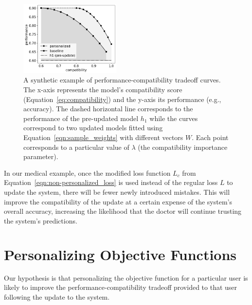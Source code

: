 \documentclass[letterpaper]{article}
\theoremstyle{definition}
\begin{document}
\begin{figure}[t]
\centering
\includegraphics[width=0.45\textwidth]{example_tradeoff}
\caption{A synthetic example of performance-compatibility tradeoff curves. The x-axis represents the model's compatibility score (Equation~\ref{eq:compatibility}) and the y-axis its performance (e.g., accuracy). The dashed horizontal line corresponds to the performance of the pre-updated model $h_1$ while the curves correspond to two updated models fitted using Equation~\ref{eqn:sample_weights} with different vectors $W$. Each point corresponds to a particular value of $\lambda$ (the compatibility importance parameter).
}
\label{fig:example_tradeoff}
\end{figure}
In our medical example, once the modified loss function $L_c$ from Equation~\ref{eqn:non-personalized_loss} is used instead of the regular loss $L$ to update the system, there will be fewer newly introduced mistakes. This will improve the compatibility of the update at a certain expense of the system's overall accuracy, increasing the likelihood that the doctor will continue trusting the system's predictions.
\section{Personalizing Objective Functions}
\label{sec:personalization}

Our hypothesis is that personalizing the objective function for a particular user is likely to improve the performance-compatibility tradeoff provided to that user following the update to the system.
\end{document}
